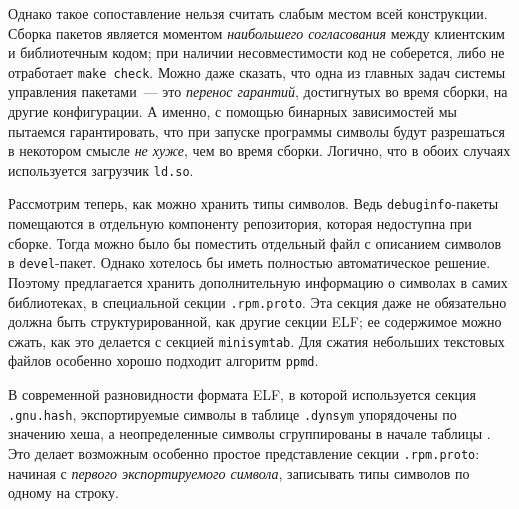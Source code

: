 \documentclass[russian,a4paper,12pt]{article}
\begin{document}
Однако такое сопоставление нельзя считать слабым местом всей конструкции.  Сборка
пакетов является моментом \textit{наибольшего согласования} между клиентским и библиотечным
кодом; при наличии несовместимости код не соберется, либо не отработает \texttt{make check}.
Можно даже сказать, что одна из главных задач системы управления пакетами~--- это
\emph{перенос гарантий}, достигнутых во время сборки, на другие конфигурации.
А именно, с помощью бинарных зависимостей мы пытаемся гарантировать, что
при запуске программы символы будут разрешаться в некотором смысле
\emph{не хуже}, чем во время сборки.  Логично, что в обоих случаях используется
загрузчик \verb|ld.so|.
\begin{comment}
Вообще само понятие бинарной совместимости следовало бы определить прежде всего
исходя из этих терминов.  Если так подумать, то никакой другой бинарной совместимости
просто больше и нету.  Ну если не брать совсем какие-нибудь высоколобые определения
про семантику и т.п.  А если брать попроще, то вот сразу после сборки программа
у нас работала.  И мы пытаемся "удержать" вокруг этой программы какие-то свойства
сборочной среды, чтобы она и дальше работала.  А если программа перестает работать,
то значит все, совместимость удержать не удалось, упустили мы бабу, то есть жарптицу
всмысле.  Птицу счастья завтрашнего дня.  Сегодня программа работает, а завтра она глючит.
Поль Мориа, любовь ушла.
\end{comment}

Рассмотрим теперь, как можно хранить типы символов.  Ведь \verb|debuginfo|-пакеты
помещаются в отдельную компоненту репозитория, которая недоступна при сборке.
Тогда можно было бы поместить отдельный файл с описанием символов в \verb|devel|-пакет.
Однако хотелось бы иметь полностью автоматическое решение.  Поэтому предлагается
хранить дополнительную информацию о символах в самих библиотеках, в специальной
секции \verb|.rpm.proto|.  Эта секция даже не обязательно должна быть структурированной,
как другие секции ELF; ее содержимое можно сжать, как это делается с секцией \verb|minisymtab|.
Для сжатия небольших текстовых файлов особенно хорошо подходит алгоритм \verb|ppmd|.

В современной разновидности формата ELF, в которой используется секция \verb|.gnu.hash|,
экспортируемые символы в таблице \verb|.dynsym| упорядочены по значению хеша,
а неопределенные символы сгруппированы в начале таблицы \cite[с.\,9]{dsohowto}.
Это делает возможным особенно простое представление секции \verb|.rpm.proto|:
начиная с \textit{первого экспортируемого символа}, записывать типы символов по одному на строку.
\end{document}
